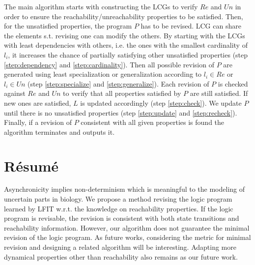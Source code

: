       
    The main algorithm starts with constructing the LCGs to verify $Re$ and $Un$ in order to ensure the reachability/unreachability properties to be satisfied.
    Then, for the unsatisfied properties, the program $P$ has to be revised.
    LCG can share the elements s.t. revising one can modify the others.
    By starting with the LCGs with least dependencies with others, i.e. the ones with the smallest cardinality of $l_i$, it increases the chance of partially satisfying other unsatisfied properties (step \ref{step:dependency} and \ref{step:cardinality}). 
    Then all possible revision of $P$ are generated using least specialization or generalization according to $l_i\in Re$ or $l_i \in Un$ (step \ref{step:specialize} and \ref{step:generalize}). 
    Each revision of $P$ is checked against $Re$ and $Un$ to verify that all properties satisfied by $P$ are still satisfied. 
    If new ones are satisfied, $L$ is updated accordingly (step \ref{step:check}).
    We update $P$ until there is no unsatisfied properties (step \ref{step:update} and \ref{step:recheck}).
    Finally, if a revision of $P$ consistent with all given properties is found the algorithm terminates and outputs it.
    
\section{R\'esum\'e}
Asynchronicity implies non-determinism which is meaningful to the modeling of uncertain parts in biology.
We propose a method revising the logic program learned by LFIT w.r.t. the knowledge on reachability properties. If the logic program is revisable, the revision is consistent with both state transitions and reachability information.
However, our algorithm does not guarantee the minimal revision of the logic program.
As future works, considering the metric for minimal revision and designing a related algorithm will be interesting.
Adapting more dynamical properties other than reachability also remains as our future work.